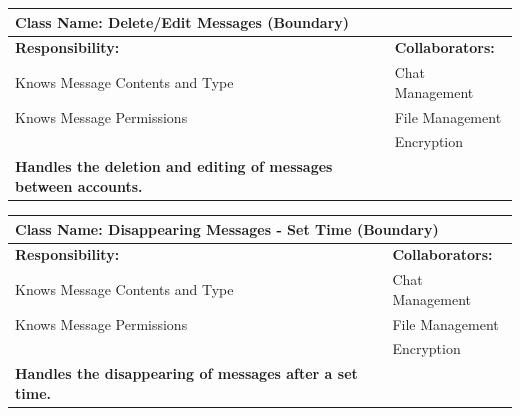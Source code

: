 \documentclass[]{article}
\begin{document}
	\begin{table}[ht]
		\centering
		\begin{tabular}{|p{7cm}|p{7cm}|}
		\hline 
		 \multicolumn{2}{|l|}{\textbf{Class Name:} Delete/Edit Messages (Boundary)} \\
		\hline
		\textbf{Responsibility:} & \textbf{Collaborators:} \\
		\hline
            Knows Message Contents and Type & Chat Management\\
            Knows Message Permissions & File Management\\
            & Encryption\\
            
            \vspace{0.1in}
            \textbf{Handles the deletion and editing of messages between accounts.}

		\vspace{1in} & \\
		\hline
  
		\end{tabular}
	\end{table}
	\begin{table}[ht]
		\centering
		\begin{tabular}{|p{7cm}|p{7cm}|}
		\hline 
		 \multicolumn{2}{|l|}{\textbf{Class Name:} Disappearing Messages - Set Time (Boundary)} \\
		\hline
		\textbf{Responsibility:} & \textbf{Collaborators:} \\
		\hline
            Knows Message Contents and Type & Chat Management\\
            Knows Message Permissions & File Management\\
            & Encryption\\
            
            \vspace{0.1in}
            \textbf{Handles the disappearing of messages after a set time.}

		\vspace{1in} & \\
		\hline
  
		\end{tabular}
	\end{table}
\end{document}

